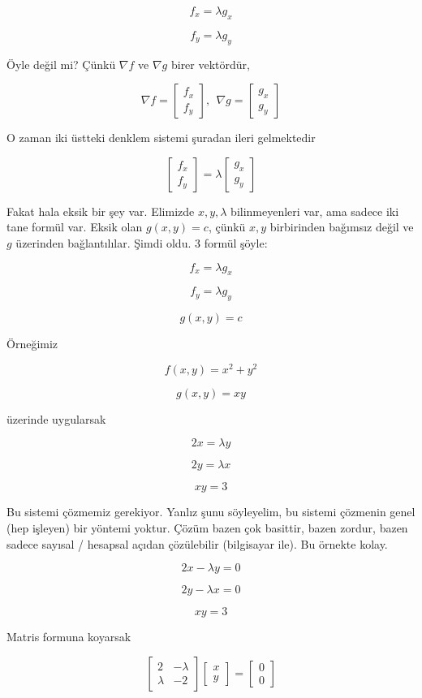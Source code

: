 \documentclass[12pt,fleqn]{article}\usepackage{../../common}
\begin{document}
$$ f_x = \lambda g_x $$

$$ f_y = \lambda g_y $$

Öyle değil mi? Çünkü $\nabla f$ ve $\nabla g$ birer vektördür, 

$$ 
\nabla f =
\left[\begin{array}{r}
f_x \\
f_y
\end{array}\right], \ \ 
\nabla g =
\left[\begin{array}{r}
g_x \\
g_y
\end{array}\right]
$$

O zaman iki üstteki denklem sistemi şuradan ileri gelmektedir

$$ 
\left[\begin{array}{r}
f_x \\
f_y
\end{array}\right]  = 
\lambda
\left[\begin{array}{r}
g_x \\
g_y
\end{array}\right]
$$

Fakat hala eksik bir şey var. Elimizde $x,y,\lambda$ bilinmeyenleri var,
ama sadece iki tane formül var. Eksik olan $g(x,y) = c$, çünkü $x,y$
birbirinden bağımsız değil ve $g$ üzerinden bağlantılılar. Şimdi oldu. 3
formül şöyle:

$$ f_x = \lambda g_x $$

$$ f_y = \lambda g_y $$

$$ g(x,y) = c $$

Örneğimiz 

$$ f(x,y) = x^2 + y^2 $$

$$ g(x,y) = xy  $$

üzerinde uygularsak

$$ 2x = \lambda y $$

$$ 2y = \lambda x $$

$$ xy = 3 $$

Bu sistemi çözmemiz gerekiyor. Yanlız şunu söyleyelim, bu sistemi çözmenin genel
(hep işleyen) bir yöntemi yoktur. Çözüm bazen çok basittir, bazen zordur, bazen
sadece sayısal / hesapsal açıdan çözülebilir (bilgisayar ile). Bu örnekte kolay.

$$ 2x - \lambda y = 0$$

$$ 2y - \lambda x = 0 $$

$$ xy = 3 $$

Matris formuna koyarsak

$$ 
\left[\begin{array}{rr}
2 & -\lambda \\
\lambda & -2
\end{array}\right]
\left[\begin{array}{r}
x \\ y
\end{array}\right]
=
\left[\begin{array}{r}
0 \\ 0
\end{array}\right]
$$
\end{document}
